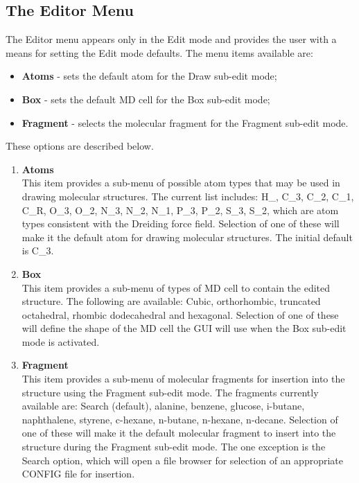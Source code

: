 \subsection{The Editor Menu}

The Editor menu appears only in the Edit mode and provides the user with a
means for setting the Edit mode defaults. The menu items available are:

\begin{itemize}
\item {\bf Atoms} - sets the default atom for the Draw sub-edit mode;
\item {\bf Box} - sets the default MD cell for the Box sub-edit mode;
\item {\bf Fragment} - selects the molecular fragment for the Fragment
  sub-edit mode.
\end{itemize}

These options are described below.

\begin{enumerate}
\item {\bf Atoms}\\
  This item provides a sub-menu of possible atom types that may be used in
  drawing molecular structures. The current list includes: H\_, C\_3, C\_2, 
  C\_1, C\_R, O\_3, O\_2, N\_3, N\_2, N\_1, P\_3, P\_2, S\_3, S\_2,
  which are atom types consistent with the Dreiding force field. Selection of
  one of these will make it the default atom for drawing molecular
  structures. The initial default is C\_3.
\item {\bf Box}\\
  This item provides a sub-menu of types of MD cell to contain the edited
  structure. The following are available: Cubic, orthorhombic, truncated
  octahedral, rhombic dodecahedral and hexagonal. Selection of one of these
  will define the shape of the MD cell the GUI will use when the Box sub-edit
  mode is activated.
\item {\bf Fragment}\\
  This item provides a sub-menu of molecular fragments for insertion into the
  structure using the Fragment sub-edit mode. The fragments currently
  available are: Search (default), alanine, benzene, glucose, i-butane,
  naphthalene, styrene, c-hexane, n-butane, n-hexane, n-decane. Selection of
  one of these will make it the default molecular fragment to insert into the
  structure during the Fragment sub-edit mode. The one exception is the Search
  option, which will open a file browser for selection of an appropriate
  CONFIG file for insertion.
\end{enumerate}

